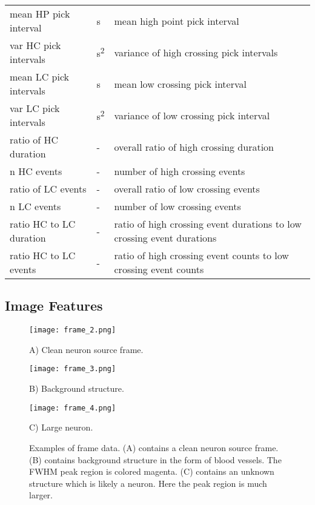 \documentclass[10pt]{article}
\begin{document}
\begin{table}[h]
\begin{tabular}{lll}
    mean HP pick interval & \si{s} &  mean high point pick interval \\
    \addlinespace[2pt]
    var HC pick intervals & \si{s^2} &  variance of high crossing pick intervals \\
    \addlinespace[2pt]
    mean LC pick intervals & \si{s} &  mean low crossing pick interval \\
    \addlinespace[2pt]
    var LC pick intervals & \si{s^2} &  variance of low crossing pick interval \\
    \addlinespace[2pt]
    ratio of HC duration & - & overall ratio of high crossing duration \\
    \addlinespace[2pt]
    n HC events & - &  number of high crossing events \\
    \addlinespace[2pt]
    ratio of LC events & - &  overall ratio of low crossing events \\
    \addlinespace[2pt]
    n LC events & - &  number of low crossing events \\
    \addlinespace[2pt]
    ratio HC to LC duration & - &  ratio of high crossing event durations to low crossing event durations \\
    \addlinespace[2pt]
    ratio HC to LC events & - &  ratio of high crossing event counts to low crossing event counts \\

    \bottomrule
  \end{tabular}
\end{table}

\subsection{Image Features}

\begin{figure}[h]
    \centering
    \begin{minipage}{.33\textwidth}
      \centering
      \texttt{[image: frame\_2.png]}
      \caption*{\footnotesize A) Clean neuron source frame.}
      \label{fig:frame1}
    \end{minipage}%
    \begin{minipage}{.33\textwidth}
      \centering
      \texttt{[image: frame\_3.png]}
      \caption*{\footnotesize B) Background structure. }
      \label{fig:frame2}
    \end{minipage}
    \begin{minipage}{.33\textwidth}
      \centering
      \texttt{[image: frame\_4.png]}
      \caption*{\footnotesize C) Large neuron. }
      \label{fig:frame3}
    \end{minipage}
    \caption{\footnotesize Examples of frame data. (A) contains a clean neuron source frame. (B) contains background structure in the form of blood vessels. The FWHM peak region is colored magenta. (C) contains an unknown structure which is likely a neuron. Here the peak region is much larger. }
\end{figure}
\end{document}
